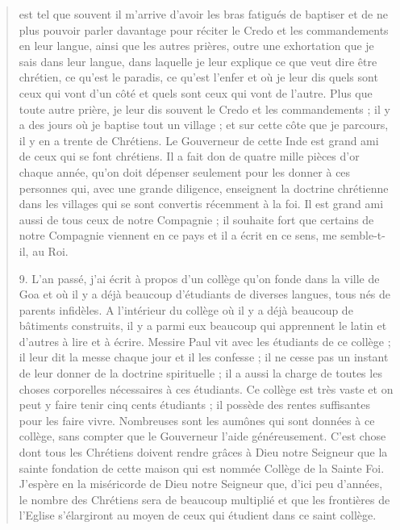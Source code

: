 \begin{quote}
est tel que souvent il m'arrive d'avoir les bras fatigués de baptiser
et de ne plus pouvoir parler davantage pour réciter le Credo et les
commandements en leur langue, ainsi que les autres prières, outre
une exhortation que je sais dans leur langue, dans laquelle je leur
explique ce que veut dire être chrétien, ce qu'est le paradis, ce
qu'est l'enfer et où je leur dis quels sont ceux qui vont d'un côté
et quels sont ceux qui vont de l'autre. Plus que toute autre prière,
je leur dis souvent le Credo et les commandements ; il y a des jours
où je baptise tout un village ; et sur cette côte que je parcours, il
y en a trente de Chrétiens. Le Gouverneur de cette Inde est grand ami de ceux qui se font
chrétiens. Il a fait don de quatre mille pièces d'or chaque année,
qu'on doit dépenser seulement pour les donner à ces personnes qui,
avec une grande diligence, enseignent la doctrine chrétienne dans
les villages qui se sont convertis récemment à la foi. Il est grand
ami aussi de tous ceux de notre Compagnie ; il souhaite fort que
  certains de notre Compagnie viennent en ce pays et il a écrit en ce
sens, me semble-t-il, au Roi.


9. L'an passé, j'ai écrit à propos d'un collège qu'on fonde dans
la ville de Goa et où il y a déjà beaucoup d'étudiants de diverses
langues, tous nés de parents infidèles. A l'intérieur du collège où
il y a déjà beaucoup de bâtiments construits, il y a parmi eux beaucoup
qui apprennent le latin et d'autres à lire et à écrire. Messire
Paul vit avec les étudiants de ce collège ; il leur dit la messe chaque
jour et il les confesse ; il ne cesse pas un instant de leur donner
de la doctrine spirituelle ; il a aussi la charge de toutes les choses
corporelles nécessaires à ces étudiants. Ce collège est très vaste
et on peut y faire tenir cinq cents étudiants ; il possède des rentes
suffisantes pour les faire vivre. Nombreuses sont les aumônes qui
sont données à ce collège, sans compter que le Gouverneur l'aide
généreusement. C'est chose dont tous les Chrétiens doivent rendre
grâces à Dieu notre Seigneur que la sainte fondation de cette maison
qui est nommée Collège de la Sainte Foi. J'espère en la miséricorde
de Dieu notre Seigneur que, d'ici peu d'années, le nombre
des Chrétiens sera de beaucoup multiplié et que les frontières de
l'Eglise s'élargiront au moyen de ceux qui étudient dans ce saint
collège.



\end{quote}
